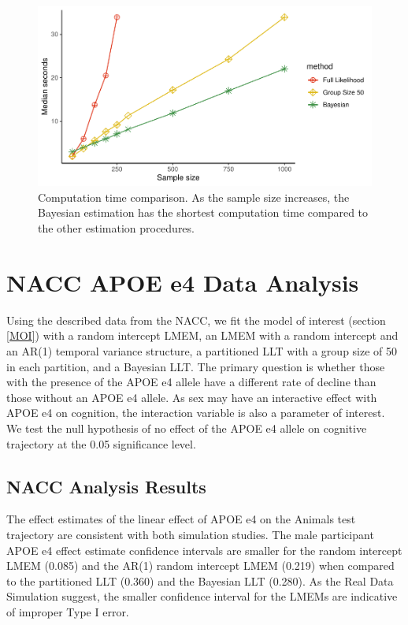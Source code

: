 \documentclass[
]{article}
\begin{document}
\begin{figure}
\centering
\includegraphics{Master_files/figure-latex/compTime-1.pdf}
\caption{\label{fig:compTime}Computation time comparison. As the sample size increases, the Bayesian estimation has the shortest computation time compared to the other estimation procedures.}
\end{figure}

\hypertarget{nacc-apoe-e4-data-analysis}{%
\section{NACC APOE e4 Data Analysis}\label{nacc-apoe-e4-data-analysis}}

Using the described data from the NACC, we fit the model of interest (section \ref{MOI}) with a random intercept LMEM, an LMEM with a random intercept and an AR(1) temporal variance structure, a partitioned LLT with a group size of 50 in each partition, and a Bayesian LLT. The primary question is whether those with the presence of the APOE e4 allele have a different rate of decline than those without an APOE e4 allele. As sex may have an interactive effect with APOE e4 on cognition, the interaction variable is also a parameter of interest. We test the null hypothesis of no effect of the APOE e4 allele on cognitive trajectory at the 0.05 significance level.

\hypertarget{nacc-analysis-results}{%
\subsection{NACC Analysis Results}\label{nacc-analysis-results}}

The effect estimates of the linear effect of APOE e4 on the Animals test trajectory are consistent with both simulation studies. The male participant APOE e4 effect estimate confidence intervals are smaller for the random intercept LMEM (0.085) and the AR(1) random intercept LMEM (0.219) when compared to the partitioned LLT (0.360) and the Bayesian LLT (0.280). As the Real Data Simulation suggest, the smaller confidence interval for the LMEMs are indicative of improper Type I error.
\end{document}
